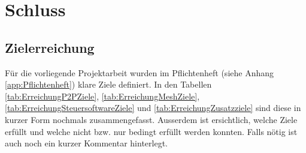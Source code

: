 \clearpage

\section{Schluss}\label{sec:Schluss}


\subsection{Zielerreichung}\label{subsec:Zielerreichung}
Für die vorliegende Projektarbeit wurden im Pflichtenheft (siehe Anhang \ref{app:Pflichtenheft}) klare Ziele definiert.
In den Tabellen \ref{tab:ErreichungP2PZiele}, \ref{tab:ErreichungMeshZiele}, \ref{tab:ErreichungSteuersoftwareZiele} und \ref{tab:ErreichungZusatzziele} sind diese in kurzer Form nochmals zusammengefasst. Ausserdem ist ersichtlich, welche Ziele erfüllt und welche nicht bzw. nur bedingt erfüllt werden konnten.
Falls nötig ist auch noch ein kurzer Kommentar hinterlegt.

